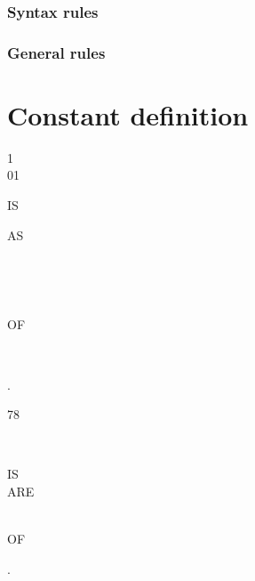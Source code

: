 \subsubsection{Syntax rules}

\subsubsection{General rules}

\section{Constant definition}

\begin{syntax}
  \begin{1=}
    1 \\
    01
  \end{1=}
  \identifier {}
  \begin{0-1}
    IS 
  \end{0-1}
  \begin{1=}
    AS
    \begin{1=}
      \literal \\
      \begin{1=}
         \\
      \end{1=}
      OF \identifier
    \end{1=} \\
    
     \identifier
  \end{1=}.
\end{syntax}

\begin{syntax}[\miscextcolour]
  78 \identifier
  \begin{1=}
     \\
  \end{1=}
  \begin{0-1}
    IS \\
    ARE
  \end{0-1}
  \begin{1=}
    \literal \\
     OF \identifier \\
  \end{1=}
  .
\end{syntax}

